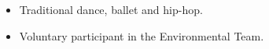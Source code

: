 \documentclass[letterpaper]{engineer_cv} %
\begin{document}
	\begin{longList} %
		\longListItem
			{}
			{}
			{}
			{\begin{itemize}
			  \item Traditional dance, ballet and hip-hop.
                          \item Voluntary participant in the Environmental Team.
			\end{itemize}}
			{}
			{}
			\\
	\end{longList}

	\raggedleft{\today}
\end{document}
